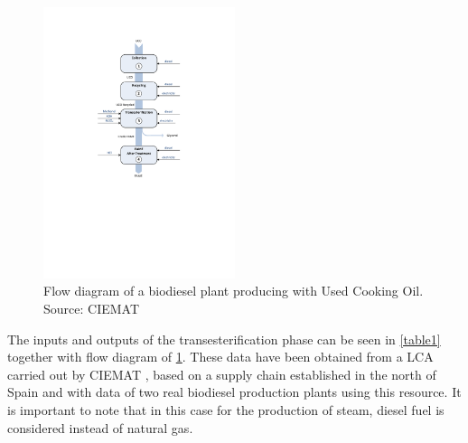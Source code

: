 \documentclass[sustainability,article,submit,moreauthors,pdftex,12pt,a4paper]{mdpi}
\begin{document}
\begin{figure}[htbp]
\centering
\includegraphics[width=0.5\textwidth]{Figure1}
\caption[Flow diagram of a biodiesel plant producing with Used Cooking Oil]{Flow diagram of a biodiesel plant producing with Used Cooking Oil. Source: CIEMAT \cite{CIEMAT2005}}
\label{fig1}
\end{figure}

The inputs and outputs of the transesterification phase can be seen in \cref{table1} together with flow diagram of \cref{fig1}. These data have been obtained from a LCA carried out by CIEMAT \cite{CIEMAT2005}, based on a supply chain established in the north of Spain and with data of two real biodiesel production plants using this resource. It is important to note that in this case for the production of steam, diesel fuel is considered instead of natural gas.
\end{document}
